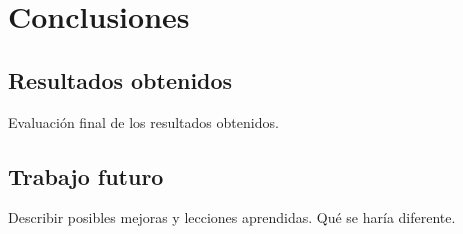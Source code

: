 \chapter{Conclusiones}

\label{Chapter5}

\section{Resultados obtenidos}
Evaluación final de los resultados obtenidos.

\section{Trabajo futuro}
Describir posibles mejoras y lecciones aprendidas. Qué se haría diferente.

